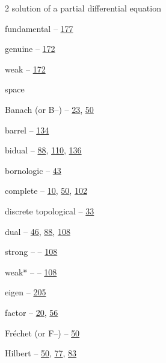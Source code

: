 \begin{multicols}{2}
\noindent solution of a partial differential equation\par
\hspace*{1.1em}fundamental -- \hyperlink{page.177}{177}\par
\hspace*{1.1em}genuine -- \hyperlink{page.172}{172}\par
\hspace*{1.1em}weak -- \hyperlink{page.172}{172}\par
\noindent space\par
\hspace*{1.1em}Banach (or B--) -- \hyperlink{page.23}{23}, \hyperlink{page.50}{50}\par
\hspace*{1.1em}barrel -- \hyperlink{page.134}{134}\par
\hspace*{1.1em}bidual -- \hyperlink{page.88}{88}, \hyperlink{page.110}{110}, \hyperlink{page.136}{136}\par
\hspace*{1.1em}bornologic -- \hyperlink{page.43}{43}\par
\hspace*{1.1em}complete -- \hyperlink{page.10}{10}, \hyperlink{page.50}{50}, \hyperlink{page.102}{102}\par
\hspace*{1.1em}discrete topological -- \hyperlink{page.33}{33}\par
\hspace*{1.1em}dual -- \hyperlink{page.46}{46}, \hyperlink{page.88}{88}, \hyperlink{page.108}{108}\par
\hspace*{2.2em}strong -- -- \hyperlink{page.108}{108}\par
\hspace*{2.2em}weak* -- -- \hyperlink{page.108}{108}\par
\hspace*{1.1em}eigen -- \hyperlink{page.205}{205}\par
\hspace*{1.1em}factor -- \hyperlink{page.20}{20}, \hyperlink{page.56}{56}\par
\hspace*{1.1em}Fréchet (or F--) -- \hyperlink{page.50}{50}\par
\hspace*{1.1em}Hilbert -- \hyperlink{page.50}{50}, \hyperlink{page.77}{77}, \hyperlink{page.83}{83}\par

\end{multicols}
